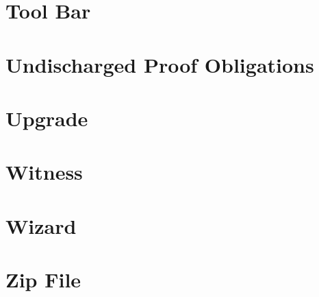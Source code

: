 \section{Tool Bar}
\label{tool_bar}

\section{Undischarged Proof Obligations}
\label{undischarged_proof_obligations}

\section{Upgrade}
\label{Upgrade}


\section{Witness}
\label{witness}

\section{Wizard}
\label{wizard}

\section{Zip File}
\label{zip_file}


